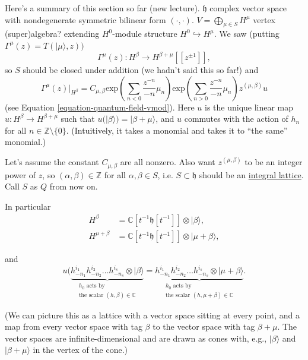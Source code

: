 \medskip\noindent
Here's a summary of this section so far (new
lecture).
$\mathfrak{h}$ complex vector space with
nondegenerate symmetric bilinear form
$(\cdot,\cdot)$.
$V=\bigoplus_{\mu \in S}H^\mu$ vertex
(super)algebra?
extending $H^0$-module structure $H^0
\hookrightarrow H^\mu$.
We saw (putting
$\Gamma^\mu(z)=T(|\mu\rangle,z))$
$$
\Gamma^\mu(z):H^\beta \to
H^{\beta+\mu}[[z^{\pm 1}]],
$$
so $S$ should be closed under addition
(we hadn't said this so far!)
and
\begin{equation}
\label{equation-quantum-field-vmod2}
\Gamma^\mu(z)|_{H^\beta}=
C_{\mu,\beta}
\text{exp}\left(\sum_{n<0}\frac{z^{-n}}{-n}
\mu_n\right)
\text{exp}\left(\sum_{n>0}\frac{z^{-n}}{-n}
\mu_n\right)
z^{(\mu,\beta)}u
\end{equation}
(see Equation
\ref{equation-quantum-field-vmod}).
Here $u$ is the unique linear map $u:H^\beta
\to H^{\beta+\mu}$
such that
$u(|\beta\rangle)=|\beta+\mu\rangle$,
and $u$ commutes with the action of $h_n$ for
all
$n \in \mathbb{Z}\setminus \{0\}$.
(Intuitively, it takes a monomial and takes
it to
``the same'' monomial.)

Let's assume the constant $C_{\mu,\beta}$ are
all nonzero.
Also want $z^{(\mu,\beta)}$ to be an integer
power of $z$,
so $(\alpha,\beta) \in \mathbb{Z}$ for all
$\alpha,\beta \in S$,
i.e. $S \subset \mathfrak{h}$ should be an
\underline{integral lattice}.
Call $S$ as $Q$ from now on.

In particular
$$
\begin{aligned}
H^\beta&=\mathbb{C}[t^{-1}\mathfrak{h}[t^{-1}
]]\otimes|\beta\rangle,\\
H^{\mu+\beta}&=\mathbb{C}[t^{-1}\mathfrak{h}
[t^{-1}]]\otimes
|\mu+\beta\rangle,
\end{aligned}
$$

\noindent
and
$$
u(\underbrace{
h^{i_1}_{-n_1}h^{i_2}_{-n_2}\ldots
h^{i_s}_{-n_s}\otimes |\beta\rangle}
_{\substack{h_0\text{ acts by} \\ \text{the
scalar }(h,\beta) \in \mathbb{C}}}
=\underbrace{
h^{i_1}_{-n_1}h^{i_2}_{-n_2}\ldots
h^{i_s}_{-n_s}\otimes | \mu+\beta\rangle}
_{\substack{h_0\text{ acts by} \\ \text{the
scalar }(h,\mu+\beta)
\in \mathbb{C}}}.
$$

\noindent
(We can picture this as a lattice with a
vector space
sitting at every point, and a map from every
vector space
with tag $\beta$ to the vector space with tag
$\beta+\mu$.
The vector spaces are infinite-dimensional
and
are drawn as cones with, e.g.,
$|\beta\rangle$ and $|\beta+\mu\rangle$
in the vertex of the cone.)

